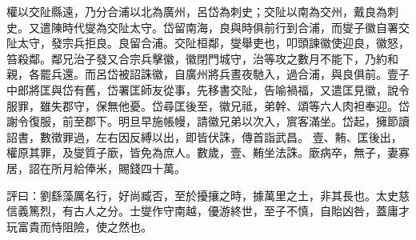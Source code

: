 \begin{pinyinscope}
 
權以交阯縣遠，乃分合浦以北為廣州，呂岱為刺史；交阯以南為交州，戴良為刺史。又遣陳時代燮為交阯太守。岱留南海，良與時俱前行到合浦，而燮子徽自署交阯太守，發宗兵拒良。良留合浦。交阯桓鄰，燮舉吏也，叩頭諫徽使迎良，徽怒，笞殺鄰。鄰兄治子發又合宗兵擊徽，徽閉門城守，治等攻之數月不能下，乃約和親，各罷兵還。而呂岱被詔誅徽，自廣州將兵晝夜馳入，過合浦，與良俱前。壹子中郎將匡與岱有舊，岱署匡師友從事，先移書交阯，告喻禍福，又遣匡見徽，說令服罪，雖失郡守，保無他憂。岱尋匡後至，徽兄祗，弟幹、頌等六人肉袒奉迎。岱謝令復服，前至郡下。明旦早施帳幔，請徽兄弟以次入，賔客滿坐。岱起，擁節讀詔書，數徵罪過，左右因反縛以出，即皆伏誅，傳首詣武昌。
 壹、䵋、匡後出，權原其罪，及燮質子廞，皆免為庶人。數歲，壹、䵋坐法誅。廞病卒，無子，妻寡居，詔在所月給俸米，賜錢四十萬。
 
 
 
 
 評曰：劉繇藻厲名行，好尚臧否，至於擾攘之時，據萬里之土，非其長也。太史慈信義篤烈，有古人之分。士燮作守南越，優游終世，至子不慎，自貽凶咎，蓋庸才玩富貴而恃阻險，使之然也。
 
 
\end{pinyinscope}
